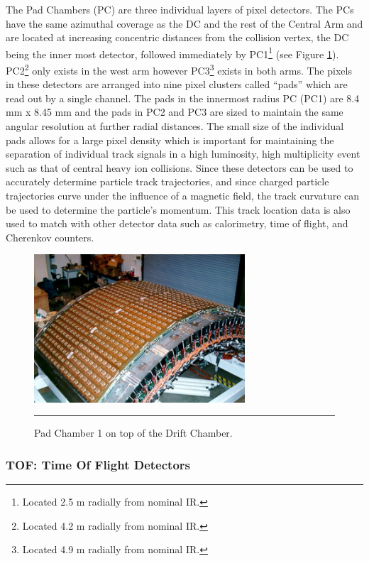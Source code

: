 The Pad Chambers \citep{PCfocus} (PC) are three individual layers of pixel detectors. The PCs have the same azimuthal coverage as the DC and the rest of the Central Arm and are located at increasing concentric distances from the collision vertex, the DC being the inner most detector, followed immediately by PC1\footnote{Located 2.5 m radially from nominal IR.} (see Figure \ref{fig:pcdiagram}). PC2\footnote{Located 4.2 m radially from nominal IR.} only exists in the west arm however PC3\footnote{Located 4.9 m radially from nominal IR.} exists in both arms. The pixels in these detectors are arranged into nine pixel clusters called ``pads'' which are read out by a single channel. The pads in the innermost radius PC (PC1) are 8.4 mm x 8.45 mm and the pads in PC2 and PC3 are sized to maintain the same angular resolution at further radial distances. The small size of the individual pads allows for a large pixel density which is important for maintaining the separation of individual track signals in a high luminosity, high multiplicity event such as that of central heavy ion collisions. Since these detectors can be used to accurately determine particle track trajectories, and since charged particle trajectories curve under the influence of a magnetic field, the track curvature can be used to determine the particle's momentum. This track location data is also used to match with other detector data such as calorimetry, time of flight, and Cherenkov counters.
\begin{figure}[htbp]
  \centering
    \includegraphics[width=0.7\textwidth]{Figures/PC1.jpg}
    \rule{35em}{0.5pt}
  \caption[Pad Chamber 1 on top of the Drift Chamber.]{Pad Chamber 1 on top of the Drift Chamber.}
  \label{fig:pcdiagram}
\end{figure}

\subsubsection{TOF: Time Of Flight Detectors}

